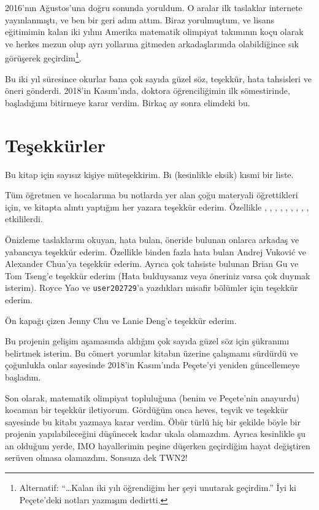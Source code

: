 2016'nın Ağustos'una doğru sonunda yoruldum. 
O aralar ilk taslaklar internete yayınlanmıştı, ve ben bir geri adım attım.
Biraz yorulmuştum, ve lisans eğitimimin kalan iki yılını
Amerika matematik olimpiyat takımının koçu olarak ve 
herkes mezun olup ayrı yollarına gitmeden arkadaşlarımda 
olabildiğince sık görüşerek geçirdim\footnote{Alternatif: ``\dots Kalan 
    iki yılı öğrendiğim her şeyi unutarak geçirdim.'' İyi ki 
    Peçete'deki notları yazmışım dedirtti.}.


Bu iki yıl süresince okurlar bana çok sayıda güzel söz, teşekkür, hata tahsisleri ve 
öneri gönderdi. 2018'in Kasım'ında, doktora öğrenciliğimin ilk sömestirinde, 
başladığımı bitirmeye karar verdim. Birkaç ay sonra elimdeki bu.

\section*{Teşekkürler}
Bu kitap için sayısız kişiye müteşekkirim. Bı (kesinlikle eksik) kısmi 
bir liste.


\begin{itemize}
\ii Tüm öğretmen ve hocalarıma bu notlarda yer alan çoğu materyali 
öğrettikleri için, ve kitapta alıntı yaptığım her yazara teşekkür ederim. 
Özellikle \cite{ref:55a}, \cite{ref:msci},
\cite{ref:manifolds}, \cite{ref:gathmann}, \cite{ref:18-435},
\cite{ref:etingof}, \cite{ref:145a}, \cite{ref:vakil},
\cite{ref:pugh}, \cite{ref:gorin} etkililerdi.

\ii Önizleme taslaklarını okuyan, hata bulan, öneride bulunan
onlarca arkadaş ve yabancıya teşekkür ederim. Özellikle 
binden fazla hata bulan Andrej Vukovi\'c ve Alexander Chua'ya 
teşekkür ederim. Ayrıca çok tahsiste bulunan Brian Gu ve Tom Tseng'e 
teşekkür ederim (Hata bulduysanız veya öneriniz varsa çok duymak isterim).
Royce Yao ve \texttt{user202729}'a yazdıkları misafir bölümler için
teşekkür ederim.

\ii Ön kapağı çizen Jenny Chu ve Lanie Deng'e teşekkür ederim.  

\ii Bu projenin gelişim aşamasında aldığım çok sayıda güzel söz için 
şükranımı belirtmek isterim. Bu cömert yorumlar kitabın üzerine 
çalışmamı sürdürdü ve çoğunlukla onlar sayesinde 2018'in Kasım'ında 
Peçete'yi yeniden güncellemeye başladım.
\end{itemize}

Son olarak, matematik olimpiyat topluluğuna 
(benim ve Peçete'nin anayurdu) kocaman bir teşekkür iletiyorum.
Gördüğüm onca heves, teşvik ve teşekkür sayesinde bu kitabı yazmaya karar verdim. 
Öbür türlü hiç bir şekilde böyle bir projenin yapılabileceğini düşünecek 
kadar ukala olamazdım. Ayrıca kesinlikle şu an olduğum yerde,
IMO hayallerimin peşine düşerken 
geçirdiğim hayat değiştiren serüven olmasa olamazdım. 
Sonsuza dek TWN2!

